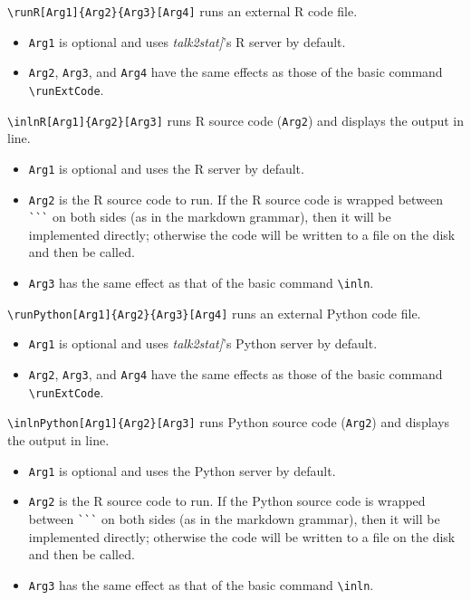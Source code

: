 \documentclass{ltxdoc}
\begin{document}
\bigskip
\noindent \verb|\runR[Arg1]{Arg2}{Arg3}[Arg4]| runs an external R code file.
\begin{itemize}
\item \texttt{Arg1} is optional and uses \textit{talk2stat]}'s R server by default.
\item \texttt{Arg2}, \texttt{Arg3}, and \texttt{Arg4} have the same effects as those of the basic command \verb|\runExtCode|. 
\end{itemize}

\noindent \verb|\inlnR[Arg1]{Arg2}[Arg3]| runs R source code (\texttt{Arg2}) and displays the output in line.
\begin{itemize}
\item \texttt{Arg1} is optional and uses the R server by default.
\item \texttt{Arg2} is the R source code to run. If the R  source code is wrapped between \verb|```| on both sides (as in the markdown grammar), then it will be implemented directly; otherwise the code will be written to a file on the disk and then be called.
\item \texttt{Arg3} has the same effect as that of the basic command  \verb|\inln|.
\end{itemize}


\bigskip
\noindent \verb|\runPython[Arg1]{Arg2}{Arg3}[Arg4]| runs an external Python code file.
\begin{itemize}
\item \texttt{Arg1} is optional and uses \textit{talk2stat]}'s Python server by default.
\item \texttt{Arg2}, \texttt{Arg3}, and \texttt{Arg4} have the same effects as those of the basic command \verb|\runExtCode|. 
\end{itemize}

\noindent \verb|\inlnPython[Arg1]{Arg2}[Arg3]| runs Python source code (\texttt{Arg2}) and displays the output in line.
\begin{itemize}
\item \texttt{Arg1} is optional and uses the Python server by default.
\item \texttt{Arg2} is the R source code to run. If the Python  source code is wrapped between \verb|```| on both sides (as in the markdown grammar), then it will be implemented directly; otherwise the code will be written to a file on the disk and then be called.
\item \texttt{Arg3} has the same effect as that of the basic command  \verb|\inln|.
\end{itemize}
\end{document}
